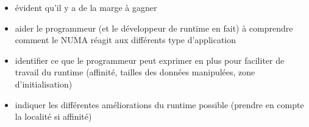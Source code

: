 \begin{itemize}
  \begin{itemize}
    \item évident qu'il y a de la marge à gagner
    \item aider le programmeur (et le développeur de runtime en fait) à comprendre comment le NUMA réagit aux différents type d'application
    \item identifier ce que le programmeur peut exprimer en plus pour faciliter de travail du runtime (affinité, tailles des données manipulées, zone d'initialisation)
    \item indiquer les différentes améliorations du runtime possible (prendre en compte la localité si affinité)
  \end{itemize}
\end{itemize}







